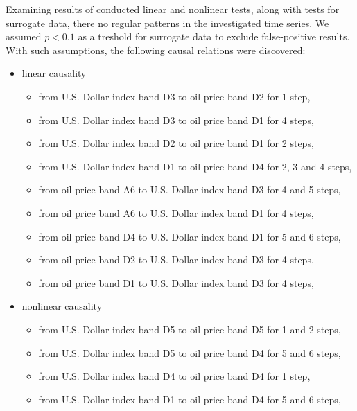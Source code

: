 Examining results of conducted linear and nonlinear tests, along with tests for surrogate data, there no regular patterns in the investigated time series.
We assumed $p < 0.1$ as a treshold for surrogate data to exclude false-positive results.
With such assumptions, the following causal relations were discovered:
\begin{itemize}
    \item linear causality
    \begin{itemize}
        \item from U.S. Dollar index band D3 to oil price band D2 for 1 step,
        \item from U.S. Dollar index band D3 to oil price band D1 for 4 steps,
        \item from U.S. Dollar index band D2 to oil price band D1 for 2 steps,
        \item from U.S. Dollar index band D1 to oil price band D4 for 2, 3 and 4 steps,
        \item from oil price band A6 to U.S. Dollar index band D3 for 4 and 5 steps,
        \item from oil price band A6 to U.S. Dollar index band D1 for 4 steps,
        \item from oil price band D4 to U.S. Dollar index band D1 for 5 and 6 steps,
        \item from oil price band D2 to U.S. Dollar index band D3 for 4 steps,
        \item from oil price band D1 to U.S. Dollar index band D3 for 4 steps,
    \end{itemize}
    \item nonlinear causality
    \begin{itemize}
        \item from U.S. Dollar index band D5 to oil price band D5 for 1 and 2 steps,
        \item from U.S. Dollar index band D5 to oil price band D4 for 5 and 6 steps,
        \item from U.S. Dollar index band D4 to oil price band D4 for 1 step,
        \item from U.S. Dollar index band D1 to oil price band D4 for 5 and 6 steps,
    \end{itemize}
\end{itemize}
